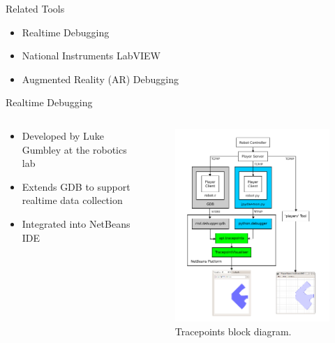 \documentclass[compress]{beamer}
\begin{document}
\begin{frame}{Related Tools}
\begin{itemize}
\item Realtime Debugging
\item National Instruments LabVIEW
\item Augmented Reality (AR) Debugging
\end{itemize}
\end{frame}

\begin{frame}{Realtime Debugging}
\begin{columns}
\begin{column}{.5\textwidth}
\begin{itemize}
\item Developed by Luke Gumbley at the robotics lab
\item Extends GDB to support realtime data collection
\item Integrated into NetBeans IDE
\end{itemize}
\end{column}
\hfill%
\begin{column}{.5\textwidth}
\begin{figure}[htbp]
  \centering
  \includegraphics[width=.75\textwidth]{images/tracepoints_gumbley.png}
  \caption{Tracepoints block diagram. \cite{Gumbley2009}}
\end{figure}
\end{column}
\end{columns}
\end{frame}
\end{document}
